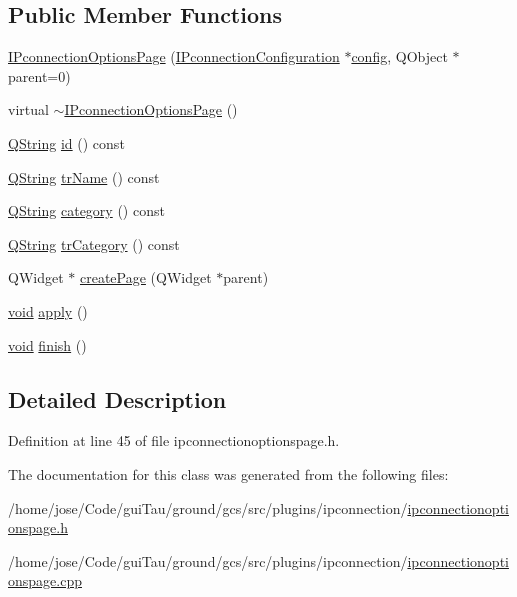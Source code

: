 \subsection*{Public Member Functions}
\begin{DoxyCompactItemize}
\item 
\hyperlink{group___i_p_conn_plugin_ga00a24fd6df6f9866d5b8e5eb76cd9c93}{I\-Pconnection\-Options\-Page} (\hyperlink{class_i_pconnection_configuration}{I\-Pconnection\-Configuration} $\ast$\hyperlink{deflate_8c_a4473b5227787415097004fd39f55185e}{config}, Q\-Object $\ast$parent=0)
\item 
virtual \hyperlink{group___i_p_conn_plugin_ga3b3b7d2dfd99db070bc9e3bebfaee3aa}{$\sim$\-I\-Pconnection\-Options\-Page} ()
\item 
\hyperlink{group___u_a_v_objects_plugin_gab9d252f49c333c94a72f97ce3105a32d}{Q\-String} \hyperlink{group___i_p_conn_plugin_ga4e312ba72e8ed237e148f6f2fd3bfd3f}{id} () const 
\item 
\hyperlink{group___u_a_v_objects_plugin_gab9d252f49c333c94a72f97ce3105a32d}{Q\-String} \hyperlink{group___i_p_conn_plugin_gaf5ef5d6b22e3098d76849cf94feeb35c}{tr\-Name} () const 
\item 
\hyperlink{group___u_a_v_objects_plugin_gab9d252f49c333c94a72f97ce3105a32d}{Q\-String} \hyperlink{group___i_p_conn_plugin_ga74c9ab9f46cce418606d0ee3fc3491a0}{category} () const 
\item 
\hyperlink{group___u_a_v_objects_plugin_gab9d252f49c333c94a72f97ce3105a32d}{Q\-String} \hyperlink{group___i_p_conn_plugin_gace8ed46c336f3ee28ed2afeae6088da2}{tr\-Category} () const 
\item 
Q\-Widget $\ast$ \hyperlink{group___i_p_conn_plugin_gabfa6c9961024b87e52e12a8e7145e4f6}{create\-Page} (Q\-Widget $\ast$parent)
\item 
\hyperlink{group___u_a_v_objects_plugin_ga444cf2ff3f0ecbe028adce838d373f5c}{void} \hyperlink{group___i_p_conn_plugin_gab7a01d955726b8a348fd5b7ee7ed1406}{apply} ()
\item 
\hyperlink{group___u_a_v_objects_plugin_ga444cf2ff3f0ecbe028adce838d373f5c}{void} \hyperlink{group___i_p_conn_plugin_gad905bf02420acad58a684461d456bd09}{finish} ()
\end{DoxyCompactItemize}


\subsection{Detailed Description}


Definition at line 45 of file ipconnectionoptionspage.\-h.



The documentation for this class was generated from the following files\-:\begin{DoxyCompactItemize}
\item 
/home/jose/\-Code/gui\-Tau/ground/gcs/src/plugins/ipconnection/\hyperlink{ipconnectionoptionspage_8h}{ipconnectionoptionspage.\-h}\item 
/home/jose/\-Code/gui\-Tau/ground/gcs/src/plugins/ipconnection/\hyperlink{ipconnectionoptionspage_8cpp}{ipconnectionoptionspage.\-cpp}\end{DoxyCompactItemize}
